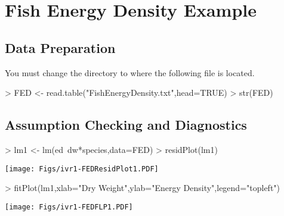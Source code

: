 \documentclass[a4paper]{article}
\begin{document}
\newpage
\section{Fish Energy Density Example}
\subsection{Data Preparation}
You must change the directory to where the following file is located.
\begin{Schunk}
\begin{Sinput}
> FED <- read.table("FishEnergyDensity.txt",head=TRUE)
> str(FED)
\end{Sinput}
\end{Schunk}

\subsection{Assumption Checking and Diagnostics}
\begin{Schunk}
\begin{Sinput}
> lm1 <- lm(ed~dw*species,data=FED)
> residPlot(lm1)
\end{Sinput}
\end{Schunk}
\texttt{[image: Figs/ivr1-FEDResidPlot1.PDF]}

\begin{Schunk}
\end{Schunk}


\begin{Schunk}
\begin{Sinput}
> fitPlot(lm1,xlab="Dry Weight",ylab="Energy Density",legend="topleft")
\end{Sinput}
\end{Schunk}
\texttt{[image: Figs/ivr1-FEDFLP1.PDF]}
\end{document}
